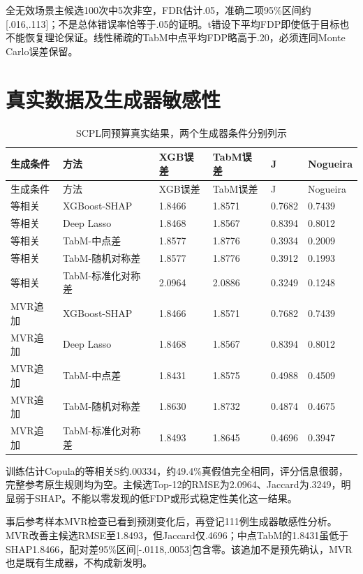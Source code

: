 \documentclass{sufethesismas}
\begin{document}
全无效场景主候选100次中5次非空，FDR估计.05，准确二项95\%区间约{[}.016,.113{]}；不是总体错误率恰等于.05的证明。t错设下平均FDP即使低于目标也不能恢复理论保证。线性稀疏的TabM中点平均FDP略高于.20，必须连同Monte Carlo误差保留。

\section{真实数据及生成器敏感性}

{
\footnotesize
\begin{longtable}[]{@{}llllll@{}}
\caption{SCPL同预算真实结果，两个生成器条件分别列示}\tabularnewline
\toprule\noalign{}
生成条件 & 方法 & XGB误差 & TabM误差 & J & Nogueira \\
\midrule\noalign{}
\endfirsthead
\toprule\noalign{}
生成条件 & 方法 & XGB误差 & TabM误差 & J & Nogueira \\
\midrule\noalign{}
\endhead
\bottomrule\noalign{}
\endlastfoot
等相关 & XGBoost-SHAP & 1.8466 & 1.8571 & 0.7682 & 0.7439 \\
等相关 & Deep Lasso & 1.8468 & 1.8567 & 0.8394 & 0.8012 \\
等相关 & TabM-中点差 & 1.8577 & 1.8776 & 0.3934 & 0.2009 \\
等相关 & TabM-随机对称差 & 1.8577 & 1.8776 & 0.3912 & 0.1993 \\
等相关 & TabM-标准化对称差 & 2.0964 & 2.0886 & 0.3249 & 0.1248 \\
MVR追加 & XGBoost-SHAP & 1.8466 & 1.8571 & 0.7682 & 0.7439 \\
MVR追加 & Deep Lasso & 1.8468 & 1.8567 & 0.8394 & 0.8012 \\
MVR追加 & TabM-中点差 & 1.8431 & 1.8575 & 0.4988 & 0.4509 \\
MVR追加 & TabM-随机对称差 & 1.8630 & 1.8732 & 0.4874 & 0.4675 \\
MVR追加 & TabM-标准化对称差 & 1.8493 & 1.8645 & 0.4696 & 0.3947 \\
\end{longtable}
}

训练估计Copula的等相关S约.00334，约49.4\%真假值完全相同，评分信息很弱，完整参考原生规则均为空。主候选Top-12的RMSE为2.0964、Jaccard为.3249，明显弱于SHAP。不能以零发现的低FDP或形式稳定性美化这一结果。

事后参考样本MVR检查已看到预测变化后，再登记111例生成器敏感性分析。MVR改善主候选RMSE至1.8493，但Jaccard仅.4696；中点TabM的1.8431虽低于SHAP1.8466，配对差95\%区间{[}-.0118,.0053{]}包含零。该追加不是预先确认，MVR也是既有生成器，不构成新发明。
\end{document}
